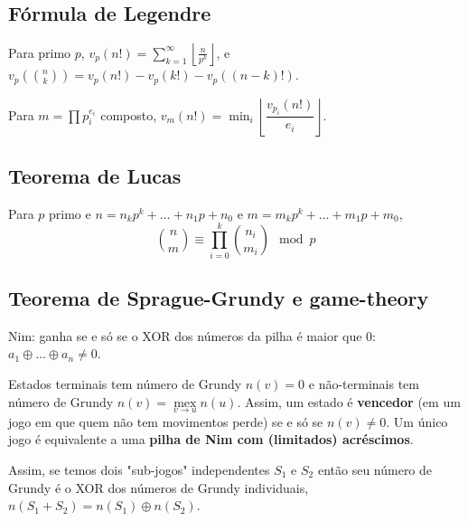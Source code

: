 \subsection{Fórmula de Legendre}

Para primo $p$, $v_p(n!) = \sum_{k=1}^{\infty} \left\lfloor \frac{n}{p^k} \right\rfloor$, e
$v_p\left(\binom{n}{k}\right) = v_p(n!) - v_p(k!) - v_p((n-k)!)$.

Para $m = \prod p_i^{e_i}$ composto, $v_m(n!) = \min_i \left\lfloor \dfrac{v_{p_i}(n!)}{e_i} \right\rfloor$.

\subsection{Teorema de Lucas}

Para $p$ primo e $n = n_k p^k + \dotsc + n_1 p + n_0$ e $m = m_k p^k + \dotsc + m_1 p + m_0$,
\[\binom{n}{m} \equiv \prod_{i=0}^{k}\binom{n_i}{m_i} \mod p\]

\subsection{Teorema de Sprague-Grundy e game-theory}

Nim: ganha se e só se o XOR dos números da pilha é maior que $0$: $a_1 \oplus \dotsc \oplus a_n \neq 0$.

Estados terminais tem número de Grundy $n(v) = 0$ e não-terminais tem número de Grundy $n(v) = \operatorname{mex}\limits_{v \to u}n(u)$. Assim,
um estado é \textbf{vencedor} (em um jogo em que quem não tem movimentos perde) se e só se $n(v) \neq 0$.
Um único jogo é equivalente a uma \textbf{pilha de Nim com (limitados) acréscimos}.

Assim, se temos dois "sub-jogos" independentes $S_1$ e $S_2$ então seu número de Grundy é o XOR dos números de Grundy individuais, $n(S_1 + S_2) = n(S_1) \oplus n(S_2)$.
